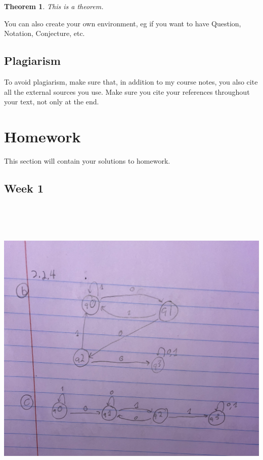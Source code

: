\documentclass{article}
\theoremstyle{theorem}
\newtheorem{theorem}{Theorem}[section]
\theoremstyle{definition}
\theoremstyle{remark}
\begin{document}
\begin{theorem}
This is a theorem.
\end{theorem}

\noindent You can also create your own environment, eg if you want to have Question, Notation, Conjecture, etc.

\subsection{Plagiarism}

To avoid plagiarism, make sure that, in addition to my course notes, you also cite all the external sources you use. Make sure you cite your references throughout your text, not only at the end.

\section{Homework}\label{homework}

This section will contain your solutions to homework. 

\subsection{Week 1}

\medskip\begin{center}
\includegraphics[width=15cm, height=15cm]{Weel1.pdf}
\end{center}
\end{document}
